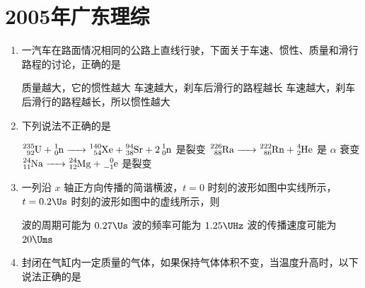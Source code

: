 \documentclass[\gkver]{gaokaozhenti}
\begin{document}
\chapter{2005年广东理综}

\begin{enumerate}
\item
一汽车在路面情况相同的公路上直线行驶，下面关于车速、惯性、质量和滑行路程的讨论，正确的是

{质量越大，它的惯性越大}
{车速越大，刹车后滑行的路程越长}
{车速越大，刹车后滑行的路程越长，所以惯性越大}


\item
下列说法不正确的是

{$\ce{^{235}_{92}U + ^{1}_{0}n -> ^{140}_{54}Xe + ^{94}_{38}Sr + 2^{1}_{0}n}$ 是裂变}
{$\ce{^{226}_{88}Ra -> ^{222}_{86}Rn + ^{4}_{2}He}$ 是 $\alpha$ 衰变}
{$\ce{^{24}_{11}Na -> ^{24}_{12}Mg + ^{0}_{-1}e}$ 是裂变}


\item
一列沿 $x$ 轴正方向传播的简谐横波，$t=0$ 时刻的波形如图中实线所示，$t=0.2\Us$ 时刻的波形如图中的虚线所示，则


{波的周期可能为 $0.27\Us$}
{波的频率可能为 $1.25\UHz$}
{波的传播速度可能为 $20\Ums$}


\item
封闭在气缸内一定质量的气体，如果保持气体体积不变，当温度升高时，以下说法正确的是


\end{enumerate}
\end{document}
